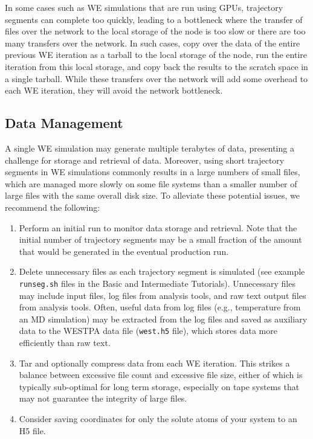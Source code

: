 \documentclass[9pt,tutorial,pubversion]{livecoms}
\begin{document}
In some cases such as WE simulations that are run using GPUs, trajectory segments can complete too quickly, leading to a bottleneck where the transfer of files over the network to the local storage of the node is too slow or there are too many transfers over the network. 
In such cases, copy over the data of the entire previous WE iteration as a tarball  to the local storage of the node, run the entire iteration from this local storage, and copy back the results to the scratch space in a single tarball. 
While these transfers over the network will add some overhead to each WE iteration, they will avoid the network bottleneck. 

\subsection{Data Management}

A single WE simulation may generate multiple terabytes of data, presenting a challenge for storage and retrieval of data. 
Moreover, using short trajectory segments in WE simulations commonly results in a large numbers of small files, which are managed more slowly on some file systems than a smaller number of large files with the same overall disk size. 
To alleviate these potential issues, we recommend the following:

\begin{enumerate}
\item Perform an initial run to monitor data storage and retrieval. 
Note that the initial number of trajectory segments may be a small fraction of the amount that would be generated in the eventual production run. 
\item Delete unnecessary files as each trajectory segment is simulated (see example \verb|runseg.sh| files in the Basic and Intermediate Tutorials). 
Unnecessary files may include input files, log files from analysis tools, and raw text output files from analysis tools. 
Often, useful data from log files (e.g., temperature from an MD simulation) may be extracted from the log files and saved as auxiliary data to the WESTPA data file (\verb|west.h5| file), which stores data more efficiently than raw text.
\item Tar and optionally compress data from each WE iteration. 
This strikes a balance between excessive file count and excessive file size, either of which is typically sub-optimal for long term storage, especially on tape systems that may not guarantee the integrity of large files.
\item Consider saving coordinates for only the solute atoms of your system to an H5 file.
\end{enumerate}
\end{document}
